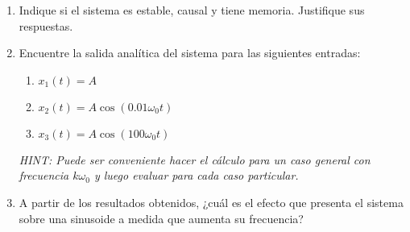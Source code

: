\documentclass[letterpaper, 12pt]{article}
\begin{document}
\begin{enumerate}
    
    \begin{enumerate}
        \item Indique si el sistema es estable, causal y tiene memoria. Justifique sus respuestas.
        \item Encuentre la salida analítica del sistema para las siguientes entradas:
        \begin{enumerate}
            \item $x_1(t) = A$
            \item $x_2(t) = A\cos(0.01\omega_0 t)$
            \item $x_3(t) = A\cos(100\omega_0 t)$
        \end{enumerate}
        \textit{HINT: Puede ser conveniente hacer el cálculo para un caso general con frecuencia $k \omega_0$ y luego evaluar para cada caso particular.}
        \item A partir de los resultados obtenidos, ¿cuál es el efecto que presenta el sistema sobre una sinusoide a medida que aumenta su frecuencia?
    \end{enumerate}
    

\end{enumerate}
\end{document}
